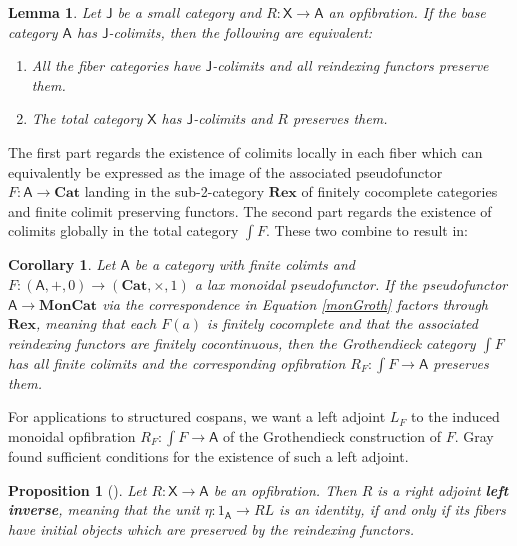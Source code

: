 \documentclass[oneside,final]{ucr}
\newtheorem{proposition}[theorem]{Proposition}
\newtheorem{lemma}[theorem]{Lemma}
\newtheorem{corollary}[theorem]{Corollary}
\theoremstyle{definition}
\newcommand{\define}[1]{{\bf \boldmath #1}}
\begin{document}
{\begin{lemma}\label{lem:fiberwiselimits}
Let $\mathsf{J}$ be a small category and $R \colon \mathsf{X} \to \mathsf{A}$ an opfibration. If the base category $\mathsf{A}$ has $\mathsf{J}$-colimits, then the following are equivalent:
\begin{enumerate}
\item{All the fiber categories have $\mathsf{J}$-colimits and all reindexing functors preserve them.}
\item{The total category $\mathsf{X}$ has $\mathsf{J}$-colimits and $R$ preserves them.}
\end{enumerate}
\end{lemma}

The first part regards the existence of colimits locally in each fiber which can equivalently be expressed as the image of the associated pseudofunctor $F \colon \mathsf{A} \to \mathbf{Cat}$ landing in the sub-2-category $\mathbf{Rex}$ of finitely cocomplete categories and finite colimit preserving functors. The second part regards the existence of colimits globally in the total category $\int F$. These two combine to result in:

\begin{corollary}\label{Rex}
Let $\mathsf{A}$ be a category with finite colimts and $F \colon (\mathsf{A},+,0) \to (\mathbf{Cat},\times,1)$ a lax monoidal pseudofunctor. If the pseudofunctor $\mathsf{A} \to \mathbf{MonCat}$ via the correspondence in Equation \ref{monGroth} factors through $\mathbf{Rex}$, meaning that each $F(a)$ is finitely cocomplete and that the associated reindexing functors are finitely cocontinuous, then the Grothendieck category $\int F$ has all finite colimits and the corresponding opfibration $R_F \colon \int F \to \mathsf{A}$ preserves them.
\end{corollary}

For applications to structured cospans, we want a left adjoint $L_F$ to the induced monoidal opfibration $R_F \colon \int F \to \mathsf{A}$ of the Grothendieck construction of $F$. Gray found sufficient conditions for the existence of such a left adjoint.

\begin{proposition}[{{\cite[Prop.\ 4.4]{Gray}}}]\label{prop:opfibtolari}
Let $R \colon \mathsf{X} \to \mathsf{A}$ be an opfibration. Then $R$ is a right adjoint \define{left inverse}, meaning that the unit $ \eta \colon 1_\mathsf{A} \to RL$ is an identity, if and only if its fibers have initial objects which are preserved by the reindexing functors.
\end{proposition}

}
\end{document}
